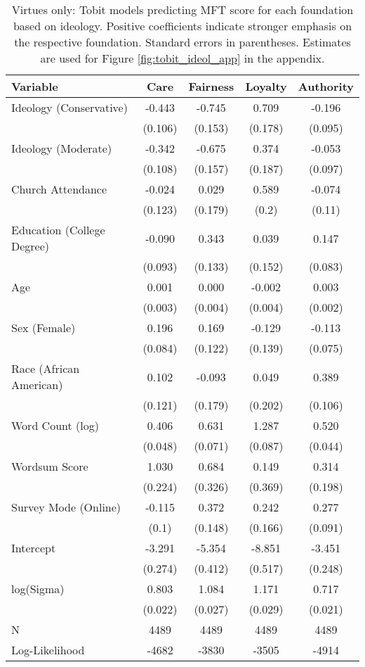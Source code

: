 \begin{table}[ht]
\centering
\caption[Virtues only: Tobit models predicting MFT score for each foundation based 
           on ideology]{Virtues only: Tobit models predicting MFT score for each foundation based 
           on ideology. Positive coefficients indicate stronger emphasis on the respective 
           foundation. Standard errors in parentheses. Estimates are used for 
           Figure \ref{fig:tobit_ideol_app} in the appendix.} 
\label{tab:tobit_virtue}
\begingroup\footnotesize
\begin{tabular}{lcccc}
  \hline
Variable & Care & Fairness & Loyalty & Authority \\ 
  \hline
Ideology (Conservative) & -0.443 & -0.745 &  0.709 & -0.196 \\ 
   & (0.106) & (0.153) & (0.178) & (0.095) \\ 
  Ideology (Moderate) & -0.342 & -0.675 &  0.374 & -0.053 \\ 
   & (0.108) & (0.157) & (0.187) & (0.097) \\ 
  Church Attendance & -0.024 &  0.029 &  0.589 & -0.074 \\ 
   & (0.123) & (0.179) & (0.2) & (0.11) \\ 
  Education (College Degree) & -0.090 &  0.343 &  0.039 &  0.147 \\ 
   & (0.093) & (0.133) & (0.152) & (0.083) \\ 
  Age &  0.001 &  0.000 & -0.002 &  0.003 \\ 
   & (0.003) & (0.004) & (0.004) & (0.002) \\ 
  Sex (Female) &  0.196 &  0.169 & -0.129 & -0.113 \\ 
   & (0.084) & (0.122) & (0.139) & (0.075) \\ 
  Race (African American) &  0.102 & -0.093 &  0.049 &  0.389 \\ 
   & (0.121) & (0.179) & (0.202) & (0.106) \\ 
  Word Count (log) &  0.406 &  0.631 &  1.287 &  0.520 \\ 
   & (0.048) & (0.071) & (0.087) & (0.044) \\ 
  Wordsum Score &  1.030 &  0.684 &  0.149 &  0.314 \\ 
   & (0.224) & (0.326) & (0.369) & (0.198) \\ 
  Survey Mode (Online) & -0.115 &  0.372 &  0.242 &  0.277 \\ 
   & (0.1) & (0.148) & (0.166) & (0.091) \\ 
  Intercept & -3.291 & -5.354 & -8.851 & -3.451 \\ 
   & (0.274) & (0.412) & (0.517) & (0.248) \\ 
  log(Sigma) &  0.803 &  1.084 &  1.171 &  0.717 \\ 
   & (0.022) & (0.027) & (0.029) & (0.021) \\ 
   \hline
N & 4489 & 4489 & 4489 & 4489 \\ 
  Log-Likelihood & -4682 & -3830 & -3505 & -4914 \\ 
   \hline
\end{tabular}
\endgroup
\end{table}
